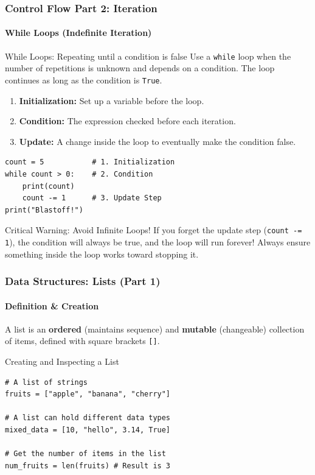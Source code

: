 \documentclass{beamer}
\begin{document}
\begin{frame}[fragile]
    \frametitle{Control Flow Part 2: Iteration}
    \framesubtitle{While Loops (Indefinite Iteration)}

    \begin{block}{While Loops: Repeating until a condition is false}
        Use a \texttt{while} loop when the number of repetitions is unknown and depends on a condition. The loop continues as long as the condition is \texttt{True}.
        
        \begin{enumerate}
            \item \textbf{Initialization:} Set up a variable before the loop.
            \item \textbf{Condition:} The expression checked before each iteration.
            \item \textbf{Update:} A change inside the loop to eventually make the condition false.
        \end{enumerate}
        
        \begin{verbatim}
count = 5           # 1. Initialization
while count > 0:    # 2. Condition
    print(count)
    count -= 1      # 3. Update Step
print("Blastoff!")
        \end{verbatim}
    \end{block}

    \begin{alertblock}{Critical Warning: Avoid Infinite Loops!}
        If you forget the update step (\texttt{count -= 1}), the condition will always be true, and the loop will run forever! Always ensure something inside the loop works toward stopping it.
    \end{alertblock}
\end{frame}

\begin{frame}[fragile]
    \frametitle{Data Structures: Lists (Part 1)}
    \framesubtitle{Definition \& Creation}

    A list is an \textbf{ordered} (maintains sequence) and \textbf{mutable} (changeable) collection of items, defined with square brackets \texttt{[]}.

    \begin{block}{Creating and Inspecting a List}
        \begin{verbatim}
# A list of strings
fruits = ["apple", "banana", "cherry"]

# A list can hold different data types
mixed_data = [10, "hello", 3.14, True]

# Get the number of items in the list
num_fruits = len(fruits) # Result is 3
        \end{verbatim}
    \end{block}
\end{frame}
\end{document}
